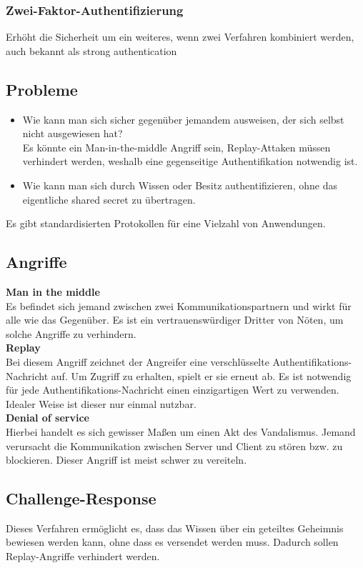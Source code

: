 \documentclass{article} %
\begin{document}
\subsubsection{Zwei-Faktor-Authentifizierung}
Erhöht die Sicherheit um ein weiteres, wenn zwei Verfahren kombiniert werden, auch bekannt als \glqq strong authentication\grqq


\subsection{Probleme}
	\begin{itemize}
	\item Wie kann man sich sicher gegenüber jemandem ausweisen, der sich selbst nicht ausgewiesen hat? \\
	Es könnte ein Man-in-the-middle Angriff sein, Replay-Attaken müssen verhindert werden, weshalb eine gegenseitige Authentifikation notwendig ist.
	\item Wie kann man sich durch Wissen oder Besitz authentifizieren, ohne das eigentliche shared secret zu übertragen.
	\end{itemize}
Es gibt standardisierten Protokollen für eine Vielzahl von Anwendungen.
\subsection{Angriffe}
\noindent\textbf{Man in the middle}\\
Es befindet sich jemand zwischen zwei Kommunikationspartnern und wirkt für alle wie das Gegenüber. Es ist ein vertrauenswürdiger Dritter von Nöten, um solche Angriffe zu verhindern.\\

\noindent\textbf{Replay}\\
Bei diesem Angriff zeichnet der Angreifer eine verschlüsselte Authentifikations-Nachricht auf. Um Zugriff zu erhalten, spielt er sie erneut ab. Es ist notwendig für jede Authentifikations-Nachricht einen einzigartigen Wert zu verwenden. Idealer Weise ist dieser nur einmal nutzbar.\\

\noindent\textbf{Denial of service}\\
Hierbei handelt es sich gewisser Maßen um einen Akt des Vandalismus. Jemand verursacht die Kommunikation zwischen Server und Client zu stören bzw. zu blockieren. Dieser Angriff ist meist schwer zu vereiteln.


\subsection{Challenge-Response}
Dieses Verfahren ermöglicht es, dass das Wissen über ein geteiltes Geheimnis bewiesen werden kann, ohne dass es versendet werden muss. Dadurch sollen Replay-Angriffe verhindert werden.
\end{document}
